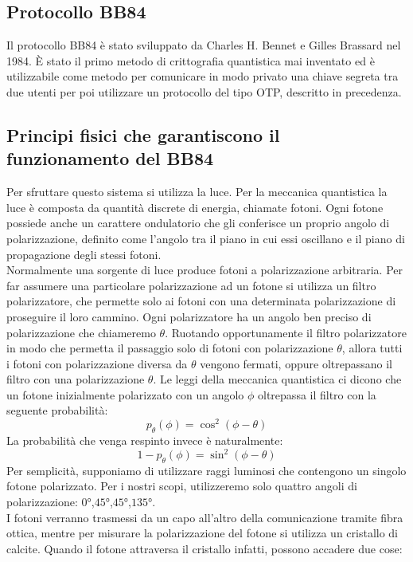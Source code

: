 \documentclass[italian,A4,12pt]{article}
\begin{document}
    \subsection{Protocollo BB84}
    Il protocollo BB84 è stato sviluppato da Charles H. Bennet e Gilles Brassard nel 1984.
    È stato il primo metodo di crittografia quantistica mai inventato ed è utilizzabile come metodo per comunicare in modo privato una chiave segreta tra due utenti per poi utilizzare un protocollo del tipo OTP, descritto in precedenza.\\
    \subsection{Principi fisici che garantiscono il funzionamento del BB84}
    Per sfruttare questo sistema si utilizza la luce. Per la meccanica quantistica la luce è composta da quantità discrete di energia, chiamate fotoni. Ogni fotone possiede anche un carattere ondulatorio che gli conferisce un proprio angolo di polarizzazione, definito come l'angolo tra il piano in cui essi oscillano e il piano di propagazione degli stessi fotoni.\\
    Normalmente una sorgente di luce produce fotoni a polarizzazione arbitraria. Per far assumere una particolare polarizzazione ad un fotone si utilizza un filtro polarizzatore, che permette solo ai fotoni con una determinata polarizzazione di proseguire il loro cammino. Ogni polarizzatore ha un angolo ben preciso di polarizzazione che chiameremo $\theta$.
    Ruotando opportunamente il filtro polarizzatore in modo che permetta il passaggio solo di fotoni con polarizzazione $\theta$, allora tutti i fotoni con polarizzazione diversa da $\theta$ vengono fermati, oppure oltrepassano il filtro con una polarizzazione $\theta$.
    Le leggi della meccanica quantistica ci dicono che un fotone inizialmente polarizzato con un angolo $\phi$ oltrepassa il filtro con la seguente probabilità:
    \begin{equation}
    p_{\theta}(\phi)=\cos^2(\phi-\theta) \label{prob}
    \end{equation}
    La probabilità che venga respinto invece è naturalmente:
    $$1-p_{\theta}(\phi)=\sin^2(\phi-\theta)$$
    Per semplicità, supponiamo di utilizzare raggi luminosi che contengono un singolo fotone polarizzato.
    Per i nostri scopi, utilizzeremo solo quattro angoli di polarizzazione: $\ang{0}$,$\ang{45}$,$\ang{45}$,$\ang{135}$.\\
    I fotoni verranno trasmessi da un capo all'altro della comunicazione tramite fibra ottica, mentre per misurare la polarizzazione del fotone si utilizza un cristallo di calcite. Quando il fotone attraversa il cristallo infatti, possono accadere due cose:
\end{document}
